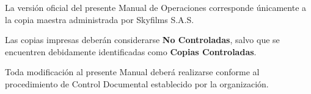 \vspace{0.5cm}

\begin{tcolorbox}[title=Control de Vigencia,colback=gray!5,colframe=black]

La versión oficial del presente Manual de Operaciones corresponde únicamente a la copia maestra administrada por Skyfilms S.A.S.

Las copias impresas deberán considerarse \textbf{No Controladas}, salvo que se encuentren debidamente identificadas como \textbf{Copias Controladas}.

Toda modificación al presente Manual deberá realizarse conforme al procedimiento de Control Documental establecido por la organización.

\end{tcolorbox}


